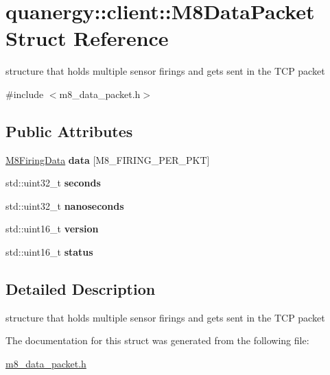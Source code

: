 \hypertarget{structquanergy_1_1client_1_1M8DataPacket}{\section{quanergy\-:\-:client\-:\-:M8\-Data\-Packet Struct Reference}
\label{structquanergy_1_1client_1_1M8DataPacket}
}


structure that holds multiple sensor firings and gets sent in the T\-C\-P packet  




{\ttfamily \#include $<$m8\-\_\-data\-\_\-packet.\-h$>$}

\subsection*{Public Attributes}
\begin{DoxyCompactItemize}
\item 
\hypertarget{structquanergy_1_1client_1_1M8DataPacket_aef4dc4c367369ce9c6bfe6f113339f28}{\hyperlink{structquanergy_1_1client_1_1M8FiringData}{M8\-Firing\-Data} {\bfseries data} \mbox{[}M8\-\_\-\-F\-I\-R\-I\-N\-G\-\_\-\-P\-E\-R\-\_\-\-P\-K\-T\mbox{]}}\label{structquanergy_1_1client_1_1M8DataPacket_aef4dc4c367369ce9c6bfe6f113339f28}

\item 
\hypertarget{structquanergy_1_1client_1_1M8DataPacket_a0d786879e71494b8b8151a567ab4460d}{std\-::uint32\-\_\-t {\bfseries seconds}}\label{structquanergy_1_1client_1_1M8DataPacket_a0d786879e71494b8b8151a567ab4460d}

\item 
\hypertarget{structquanergy_1_1client_1_1M8DataPacket_a9ecaa99ba83ffb647788d90f913fb6c7}{std\-::uint32\-\_\-t {\bfseries nanoseconds}}\label{structquanergy_1_1client_1_1M8DataPacket_a9ecaa99ba83ffb647788d90f913fb6c7}

\item 
\hypertarget{structquanergy_1_1client_1_1M8DataPacket_a11378e45d412431268b093e4b343588f}{std\-::uint16\-\_\-t {\bfseries version}}\label{structquanergy_1_1client_1_1M8DataPacket_a11378e45d412431268b093e4b343588f}

\item 
\hypertarget{structquanergy_1_1client_1_1M8DataPacket_a611cc8752437f8c491d5a60e06dac6cb}{std\-::uint16\-\_\-t {\bfseries status}}\label{structquanergy_1_1client_1_1M8DataPacket_a611cc8752437f8c491d5a60e06dac6cb}

\end{DoxyCompactItemize}


\subsection{Detailed Description}
structure that holds multiple sensor firings and gets sent in the T\-C\-P packet 

The documentation for this struct was generated from the following file\-:\begin{DoxyCompactItemize}
\item 
\hyperlink{m8__data__packet_8h}{m8\-\_\-data\-\_\-packet.\-h}\end{DoxyCompactItemize}
